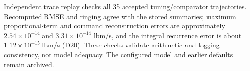 Independent trace replay checks all 35 accepted tuning/comparator trajectories. Recomputed RMSE and ringing agree with the stored summaries; maximum proportional-term and command reconstruction errors are approximately $2.54\times10^{-14}$ and $3.31\times10^{-14}$ lbm/s, and the integral recurrence error is about $1.12\times10^{-15}$ lbm/s (D20). These checks validate arithmetic and logging consistency, not model adequacy. The configured model and earlier defaults remain archived.



